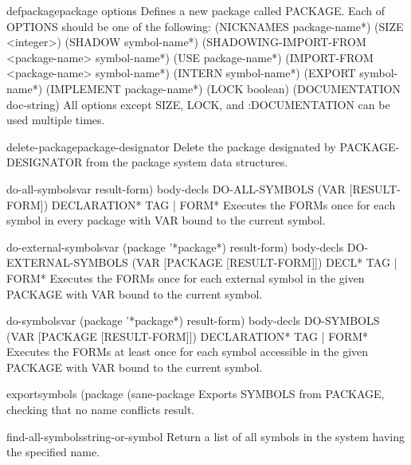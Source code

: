 \begin{macro}{defpackage}{package \rest options}{}
  Defines a new package called PACKAGE. Each of OPTIONS should be one of the
   following: 
    (NICKNAMES {package-name}*)
    (SIZE <integer>)
    (SHADOW {symbol-name}*)
    (SHADOWING-IMPORT-FROM <package-name> {symbol-name}*)
    (USE {package-name}*)
    (IMPORT-FROM <package-name> {symbol-name}*)
    (INTERN {symbol-name}*)
    (EXPORT {symbol-name}*)
    (IMPLEMENT {package-name}*)
    (LOCK boolean)
    (DOCUMENTATION doc-string)
   All options except SIZE, LOCK, and :DOCUMENTATION can be used multiple
   times.
\end{macro}

\begin{function}{delete-package}{package-designator}{}
  Delete the package designated by PACKAGE-DESIGNATOR from the package
  system data structures.
\end{function}

\begin{macro}{do-all-symbols}{var \op result-form) \body body-decls}{}
  DO-ALL-SYMBOLS (VAR [RESULT-FORM]) {DECLARATION}* {TAG | FORM}*
   Executes the FORMs once for each symbol in every package with VAR bound
   to the current symbol.
\end{macro}

\begin{macro}{do-external-symbols}{var \op (package '*package*) result-form) \body body-decls}{}
  DO-EXTERNAL-SYMBOLS (VAR [PACKAGE [RESULT-FORM]]) {DECL}* {TAG | FORM}*
   Executes the FORMs once for each external symbol in the given PACKAGE with
   VAR bound to the current symbol.
\end{macro}

\begin{macro}{do-symbols}{var \op (package '*package*) result-form) \body body-decls}{}
  DO-SYMBOLS (VAR [PACKAGE [RESULT-FORM]]) {DECLARATION}* {TAG | FORM}*
   Executes the FORMs at least once for each symbol accessible in the given
   PACKAGE with VAR bound to the current symbol.
\end{macro}

\begin{function}{export}{symbols \op (package (sane-package}{}
  Exports SYMBOLS from PACKAGE, checking that no name conflicts result.
\end{function}

\begin{function}{find-all-symbols}{string-or-symbol}{}
  Return a list of all symbols in the system having the specified name.
\end{function}

